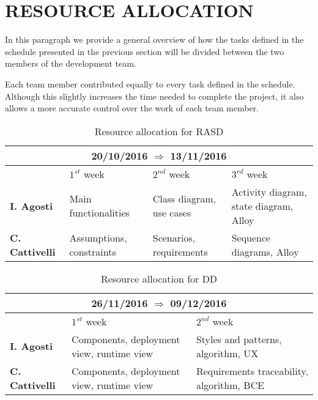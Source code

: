 \section{RESOURCE ALLOCATION}
In this paragraph we provide a general overview of how the tasks defined in the schedule presented in the previous section will be divided between the two members of the development team. 

Each team member contributed equally to every task defined in the schedule. Although this slightly increases the time needed to complete the project, it also allows a more accurate control over the work of each team member. 

\begin{table}[H]
	\centering
	\begin{tabular}{| m{2.6cm} | m{3.2cm} | m{3.2cm} | m{3.2cm} | }
		\hline
		\multicolumn{4}{|c|}{ \textbf{20/10/2016 $\Rightarrow$ 13/11/2016 } } \\
		\hline
		\hline
		\textbf & \(1^{st}\) week & \(2^{nd}\) week & \(3^{rd}\) week \\
		\hline
		\textbf{I. Agosti} & Main functionalities & Class diagram, use cases & Activity diagram, state diagram, Alloy \\
		\hline
		\textbf{C. Cattivelli} & Assumptions, constraints & Scenarios, requirements & Sequence diagrams, Alloy \\ 
		\hline
	\end{tabular}
	\caption{Resource allocation for RASD}
\end{table}

\begin{table}[H]
	\centering
	\begin{tabular}{| m{2.6cm} | m{5cm} | m{5cm} | }
		\hline
		\multicolumn{3}{|c|}{ \textbf{26/11/2016 $\Rightarrow$ 09/12/2016 } } \\
		\hline
		\hline
		\textbf & \(1^{st}\) week & \(2^{nd}\) week \\
		\hline
		\textbf{I. Agosti} & Components, deployment view, runtime view & Styles and patterns, algorithm, UX \\
		\hline
		\textbf{C. Cattivelli} & Components, deployment view, runtime view & Requirements traceability, algorithm, BCE \\ 
		\hline
	\end{tabular}
	\caption{Resource allocation for DD}
\end{table}

